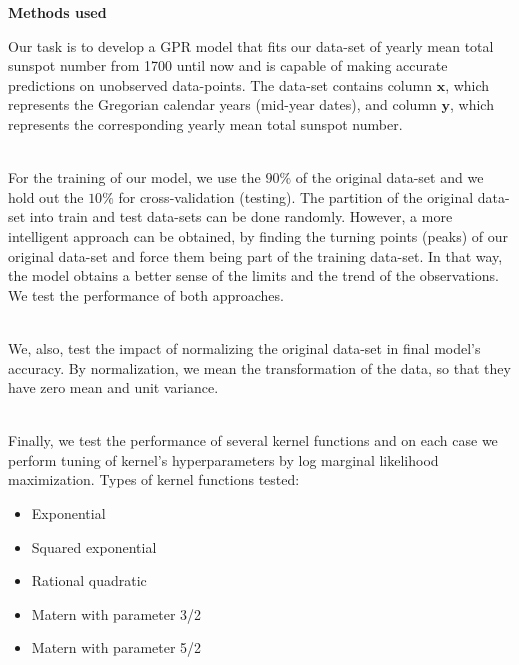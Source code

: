 \documentclass[12pt,a4paper]{article}
\newcommand{\boldmark}[1]{\noindent\textbf{#1}\\ }
\begin{document}
\newpage

\subsectionmark{}
\noindent
\boldmark{\large{Methods used}}

\normalsize

\noindent
Our task is to develop a GPR model that fits our data-set of yearly mean total sunspot number from 1700 until now and is capable of making accurate predictions on unobserved data-points. The data-set contains column $\mathbf{x}$, which represents the Gregorian calendar years (mid-year dates), and column $\mathbf{y}$, which represents the corresponding yearly mean total sunspot number.

\noindent
\\For the training of our model, we use the $90\%$ of the original data-set and we hold out the $10\%$ for cross-validation (testing). The partition of the original data-set into train and test data-sets can be done randomly. However, a more intelligent approach can be obtained, by finding the turning points (peaks) of our original data-set and force them being part of the training data-set. In that way, the model obtains a better sense of the limits and the trend of the observations. We test the performance of both approaches.

\noindent
\\We, also, test the impact of normalizing the original data-set in final model's accuracy. By normalization, we mean the transformation of the data, so that they have zero mean and unit variance.

\noindent
\\Finally, we test the performance of several kernel functions and on each case we perform tuning of kernel's hyperparameters by log marginal likelihood maximization. Types of kernel functions tested:
\begin{itemize}
    \item Exponential
    \item Squared exponential
    \item Rational quadratic
    \item Matern with parameter 3/2
    \item Matern with parameter 5/2
\end{itemize}
\end{document}
